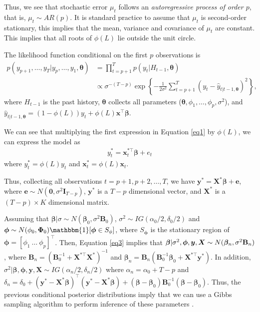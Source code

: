 Thus, we see that stochastic error $\mu_t$ follows an \textit{autoregressive process of order $p$}, that is, $\mu_t\sim AR(p)$. It is standard practice to assume that $\mu_t$ is second-order stationary, this implies that the mean, variance and covariance of $\mu_t$ are constant. This implies that all roots of $\phi(L)$ lie outside the unit circle.

The likelihood function conditional on the first $p$ observations is
\begin{align*}
	p(y_{p+1},\dots,y_T|y_{p},\dots,y_1,\bm{\theta})&=\prod_{t=p+1}^{T}p(y_t|H_{t-1},\bm{\theta})\\
	&\propto \sigma^{-(T-p)}\exp\left\{-\frac{1}{2\sigma^2}\sum_{t=p+1}^T(y_t-\hat{y}_{t|t-1,\bm{\theta}})^2\right\},
\end{align*} 
where $H_{t-1}$ is the past history, $\bm{\theta}$ collects all parameters ($\bm{\theta}, \phi_1,\dots,\phi_p, \sigma^2$), and $\hat{y}_{t|t-1,\bm{\theta}}=(1-\phi(L))y_t+\phi(L)\bm{x}^{\top}\bm{\beta}$.

We can see that multiplying the first expression in Equation \ref{eq1} by $\phi(L)$, we can express the model as 
\begin{align}\label{eq3}
	y_t^*=\bm{x}_t^{*\top}\bm{\beta}+e_t
\end{align}
where $y_t^*=\phi(L)y_t$ and $\bm{x}_t^{*}=\phi(L)\bm{x}_t$.

Thus, collecting all observations $t=p+1,p+2,\dots,T$, we have $\bm{y}^*=\bm{X}^*\bm{\beta}+\bm{e}$, where $\bm{e}\sim N(\bm{0},\sigma^2\bm{I}_{T-p})$, $\bm{y}^*$ is a $T-p$ dimensional vector, and $\bm{X}^*$ is a $(T-p)\times K$ dimensional matrix.

Assuming that $\bm{\beta}|\sigma\sim N(\bm{\beta}_0,\sigma^2\bm{B}_0)$, $\sigma^2\sim IG(\alpha_0/2,\delta_0/2)$ and $\bm{\phi}\sim N(\phi_0,\bm{\Phi}_0)\mathbbm{1}[\bm{\phi}\in S_{\phi}]$, where $S_{\bm{\phi}}$ is the stationary region of $\bm{\phi}=[\phi_1 \ \dots \ \phi_p]^{\top}$. Then, Equation \ref{eq3} implies that $\bm{\beta}|\sigma^2,\bm{\phi},\bm{y},\bm{X}\sim N(\bm{\beta}_n, \sigma^2{\bf{B}}_n)$, where $\bm{B}_n = (\bm{B}_0^{-1} + \bm{X}^{*\top}\bm{X}^{*})^{-1}$ and $\bm{\beta}_n = \bm{B}_n(\bm{B}_0^{-1}\bm{\beta}_0 + \bm{X}^{*\top}\bm{y}^{*})$. In addition, $\sigma^2|\bm{\beta},\bm{\phi},\bm{y},\bm{X}\sim IG(\alpha_n/2,\delta_n/2)$ where $\alpha_n=\alpha_0+T-p$ and $\delta_n=\delta_0+(\bm{y}^*-\bm{X}^{*}\bm{\beta})^{\top}(\bm{y}^*-\bm{X}^{*}\bm{\beta})+(\bm{\beta}-\bm{\beta}_0)\bm{B}_0^{-1}(\bm{\beta}-\bm{\beta}_0)$. Thus, the previous conditional posterior distributions imply that we can use a Gibbs sampling algorithm to perform inference of these parameters \cite{chib1993bayes}.

